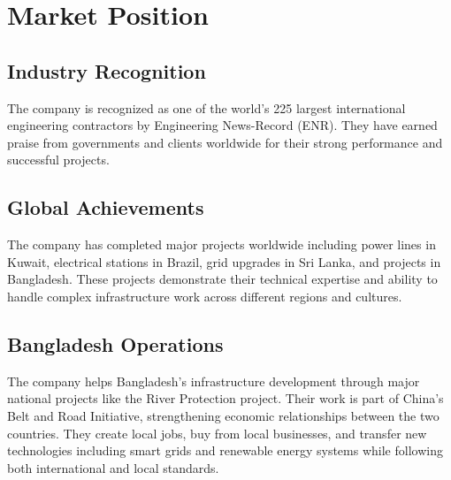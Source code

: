 \vspace{0.5em}
\section{Market Position}

\subsection{Industry Recognition}
The company is recognized as one of the world's 225 largest international engineering contractors by Engineering News-Record (ENR). They have earned praise from governments and clients worldwide for their strong performance and successful projects.

\vspace{0.3em}
\subsection{Global Achievements}
The company has completed major projects worldwide including power lines in Kuwait, electrical stations in Brazil, grid upgrades in Sri Lanka, and projects in Bangladesh. These projects demonstrate their technical expertise and ability to handle complex infrastructure work across different regions and cultures.

\vspace{0.3em}
\subsection{Bangladesh Operations}
The company helps Bangladesh's infrastructure development through major national projects like the River Protection project. Their work is part of China's Belt and Road Initiative, strengthening economic relationships between the two countries. They create local jobs, buy from local businesses, and transfer new technologies including smart grids and renewable energy systems while following both international and local standards.


